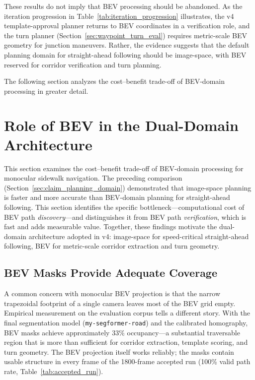 \documentclass[12pt,letterpaper,oneside]{report}
\begin{document}
These results do not imply that BEV processing should be abandoned.  As the iteration progression in Table~\ref{tab:iteration_progression} illustrates, the v4 template-approval planner returns to BEV coordinates in a verification role, and the turn planner (Section~\ref{sec:waypoint_turn_eval}) requires metric-scale BEV geometry for junction maneuvers.  Rather, the evidence suggests that the default planning domain for straight-ahead following should be image-space, with BEV reserved for corridor verification and turn planning.

The following section analyzes the cost--benefit trade-off of BEV-domain processing in greater detail.


\section{Role of BEV in the Dual-Domain Architecture}
\label{sec:claim_bev_fragility}
\label{sec:bev_fragility_results}

This section examines the cost--benefit trade-off of BEV-domain processing for monocular sidewalk navigation.  The preceding comparison (Section~\ref{sec:claim_planning_domain}) demonstrated that image-space planning is faster and more accurate than BEV-domain planning for straight-ahead following.  This section identifies the specific bottleneck---computational cost of BEV path \emph{discovery}---and distinguishes it from BEV path \emph{verification}, which is fast and adds measurable value.  Together, these findings motivate the dual-domain architecture adopted in v4: image-space for speed-critical straight-ahead following, BEV for metric-scale corridor extraction and turn geometry.

\subsection{BEV Masks Provide Adequate Coverage}

A common concern with monocular BEV projection is that the narrow trapezoidal footprint of a single camera leaves most of the BEV grid empty.  Empirical measurement on the evaluation corpus tells a different story.  With the final segmentation model (\texttt{my-segformer-road}) and the calibrated homography, BEV masks achieve approximately 33\% occupancy---a substantial traversable region that is more than sufficient for corridor extraction, template scoring, and turn geometry.  The BEV projection itself works reliably; the masks contain usable structure in every frame of the 1800-frame accepted run (100\% valid path rate, Table~\ref{tab:accepted_run}).
\end{document}
